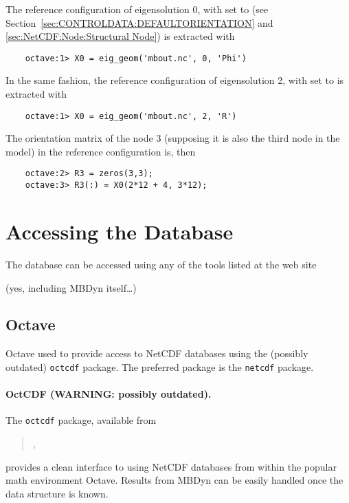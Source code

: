 The reference configuration of eigensolution 0, with 
set to  
(see Section~\ref{sec:CONTROLDATA:DEFAULTORIENTATION} 
and
\ref{sec:NetCDF:Node:Structural Node}) is extracted with
\begin{verbatim}
    octave:1> X0 = eig_geom('mbout.nc', 0, 'Phi')
\end{verbatim}
In the same fashion, the reference configuration of eigensolution 2, with
 set to  is extracted with
\begin{verbatim}
    octave:1> X0 = eig_geom('mbout.nc', 2, 'R')
\end{verbatim}
The orientation matrix of the node 3 (supposing it is also the third node in
the model) in the reference configuration is, then
\begin{verbatim}
    octave:2> R3 = zeros(3,3);
    octave:3> R3(:) = X0(2*12 + 4, 3*12);
\end{verbatim}
\section{Accessing the Database}
The database can be accessed using any of the tools listed at the web site
\begin{quote}
\end{quote}
(yes, including MBDyn itself\ldots)



\subsection{Octave}
\label{sec:NetCDF:Octave}
Octave used to provide access to NetCDF databases using the (possibly outdated) \texttt{octcdf} package.
The preferred package is the \texttt{netcdf} package.

\paragraph{OctCDF (WARNING: possibly outdated).}
The \texttt{octcdf} package, available from
\begin{quote}
,
\end{quote}
provides a clean interface to using NetCDF databases from within
the popular math environment Octave.
Results from MBDyn can be easily handled once the data structure is known.


